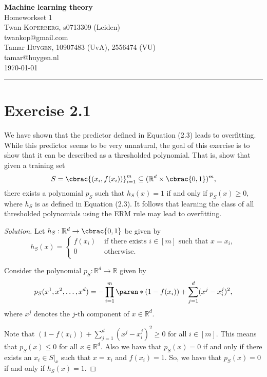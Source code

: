\documentclass[10pt, a4paper, twoside]{amsart}
\makeatletter
\newcommand{\R}{\ensuremath{\mathbb{R}}}
\DeclarePairedDelimiter\cbrac\{\}
\DeclarePairedDelimiter\paren()
\newcommand{\se}{\ensuremath{\subseteq}}
\newenvironment{solution}
               {\let\oldqedsymbol=\qedsymbol
                \renewcommand{\qedsymbol}{$\blacktriangleleft$}
                \begin{proof}[Solution]}
               {\end{proof}
                \renewcommand{\qedsymbol}{\oldqedsymbol}}
\newcommand{\firstName}  {Twan}
\newcommand{\lastName}   {Koperberg}
\newcommand{\studId}     {0713309 (Leiden)}
\renewcommand{\email}    {twankop@gmail.com}
\newcommand{\firstNameII}  {Tamar}
\newcommand{\lastNameII}   {Huygen}
\newcommand{\studIdII}     {10907483 (UvA)}
\newcommand{\studIdIII}    {2556474 (VU)}
\newcommand{\emailII}     {tamar@huygen.nl}
\makeatother
\begin{document}
\begin{center}
  {\huge\bf Machine learning theory}\\
  {\large\sc Homeworkset 1 }\\ \vspace{1em}
  \firstName \textsc{ \lastName}, {\sc s}\studId \\
  \email\text{}\\ \smallskip
  \firstNameII \textsc{ \lastNameII}, \studIdII, \studIdIII\\
  \emailII \\ \bigskip
  \today \\\bigskip
  \hrule
  \bigskip
\end{center}

\section*{Exercise 2.1}
We have shown that the predictor defined in Equation (2.3) leads to overfitting. 
While this predictor seems to be very unnatural, the goal of this exercise is to show 
that it can be described as a thresholded polynomial. 
That is, show that given a training set 
\begin{equation*}
S = \cbrac{(x_i, f(x_i))}_{i=1}^{m} \se (\R^d \times \cbrac{0,1})^m, 
\end{equation*}
there exists a polynomial $p_S$ such that $h_S(x) = 1$ if and only if $p_S(x)\geq 0$, 
where $h_S$ is as defined in Equation (2.3). It follows that learning the class of all 
thresholded polynomials using the ERM rule may lead to overfitting.
\begin{solution}
Let $h_S:\R^d\to\cbrac{0,1}$ be given by
\begin{equation*}
 h_S(x)=
 \begin{cases}
  f(x_i) & \text{ if there exists }i \in [m] \text{ such that } x=x_i, \\
  0 & \text{ otherwise.} \\  
 \end{cases}
\end{equation*}

Consider the polynomial $p_S:\R^d \to \R$ given by
\begin{equation*}
 p_S(x^1,x^2,\ldots,x^d)=-\prod_{i=1}^{m}\paren*{(1-f(x_i))+\sum_{j=1}^d(x^j-x_i^j)^2},
\end{equation*}
where $x^j$ denotes the $j$-th component of $x \in \R^d$.

Note that $(1-f(x_i))+\sum_{j=1}^d(x^j-x_i^j)^2 \geq 0$ for all $i \in [m]$.
This means that $p_{S}(x)\leq 0$ for all $x \in \R^d$. Also we have that $p_S(x)=0$ if and only if there exists an 
$x_i \in S|_x$ such that $x=x_i$ and $f(x_i)=1$. So, we have that $p_S(x)=0$ if and only if $h_S(x)=1$.
\end{solution}
\end{document}
